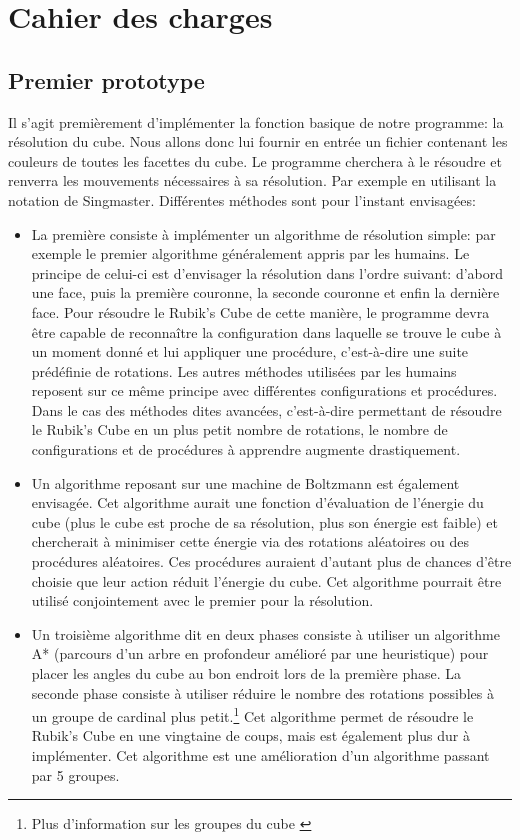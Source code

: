 \chapter{Cahier des charges}
\section{Premier prototype}
Il s'agit premièrement d'implémenter la fonction basique de notre programme: la résolution du cube. Nous allons donc lui fournir en entrée un fichier contenant les couleurs de toutes les facettes du cube. Le programme cherchera à le résoudre et renverra les mouvements nécessaires à sa résolution. Par exemple en utilisant la notation de Singmaster\cite{cite11}.
Différentes méthodes sont pour l'instant envisagées:
\begin{itemize}
    \item La première consiste à implémenter un algorithme de résolution simple: par exemple le premier algorithme généralement appris par les humains.\cite{cite2} Le principe de celui-ci est d'envisager la résolution dans l'ordre suivant: d'abord une face, puis la première couronne, la seconde couronne et enfin la dernière face\cite{cite2}. Pour résoudre le Rubik's Cube de cette manière, le programme devra être capable de reconnaître la configuration dans laquelle se trouve le cube à un moment donné et lui
    appliquer une procédure, c'est-à-dire une suite prédéfinie de rotations. Les autres méthodes utilisées par les humains reposent sur ce même principe avec différentes configurations et procédures. Dans le cas des méthodes dites avancées, c'est-à-dire permettant de résoudre le Rubik's Cube en un plus petit nombre de rotations, le nombre de configurations et de procédures à apprendre augmente drastiquement.
\item Un algorithme reposant sur une machine de Boltzmann\cite{cite10} est également envisagée. Cet algorithme aurait une fonction d'évaluation de l'énergie du cube (plus le cube est proche de sa résolution, plus son énergie est faible) et chercherait à minimiser cette énergie via des rotations aléatoires ou des procédures aléatoires. Ces procédures auraient d'autant plus de chances d'être choisie que leur action réduit l'énergie du cube. Cet algorithme pourrait être utilisé conjointement avec le premier pour la résolution.
\item Un troisième algorithme dit en deux phases consiste à utiliser un algorithme A*\cite{cite3} (parcours d'un arbre en profondeur amélioré par une heuristique) pour placer les angles du cube au bon endroit lors de la première phase. La seconde phase consiste à utiliser réduire le nombre des rotations possibles à un groupe de cardinal plus petit.\footnote{Plus d'information sur les groupes du cube \cite{cite12}} Cet algorithme permet de résoudre le Rubik's Cube en une vingtaine de coups, mais est également plus dur à implémenter\cite{cite0}. Cet
    algorithme est une amélioration d'un algorithme passant par 5 groupes\cite{cite4}.
\end{itemize}


